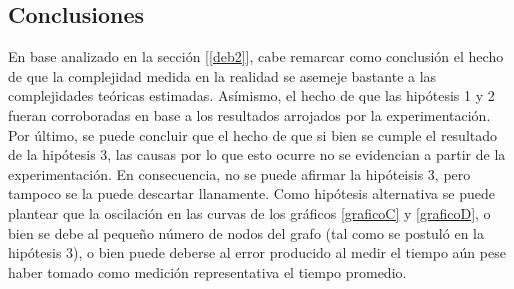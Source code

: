 \subsection{Conclusiones}
\label{conc2}
En base analizado en la sección [\ref{deb2}], cabe remarcar como conclusión el hecho de que la complejidad medida en la realidad se asemeje bastante a las complejidades teóricas estimadas. Asímismo, el hecho de que las hipótesis 1 y 2 fueran corroboradas en base a los resultados arrojados por la experimentación. \\ 
Por último, se puede concluir que el hecho de que si bien se cumple el resultado de la hipótesis 3, las causas por lo que esto ocurre no se evidencian a partir de la experimentación. En consecuencia, no se puede afirmar la hipóteisis 3, pero tampoco se la puede descartar llanamente. Como hipótesis alternativa se puede plantear que la oscilación en las curvas de los gráficos  \ref{graficoC} y \ref{graficoD}, o bien se debe al pequeño número de nodos del grafo (tal como se postuló en la hipótesis 3), o bien puede deberse al error producido al medir el tiempo aún pese haber tomado como medición representativa el tiempo promedio.


